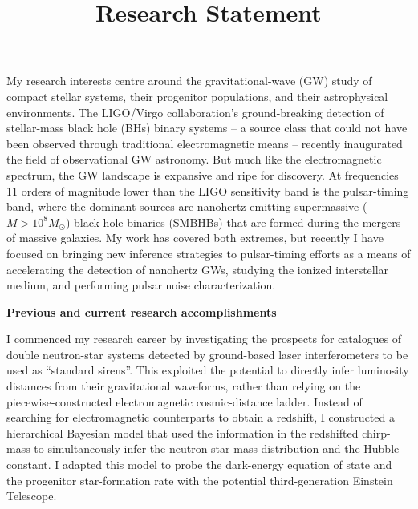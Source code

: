 \documentclass[11pt,letterpaper,sans]{moderncv} %
\title{\huge{Research Statement}}
\begin{document}
\makecvtitle %
\vspace{-6mm}

My research interests centre around the gravitational-wave (GW) study of compact stellar systems, their progenitor populations, and their astrophysical environments. The LIGO/Virgo collaboration's ground-breaking detection of stellar-mass black hole (BHs) binary systems -- a source class that could not have been observed through traditional electromagnetic means -- recently inaugurated the field of observational GW astronomy. But much like the electromagnetic spectrum, the GW landscape is expansive and ripe for discovery. At frequencies 11 orders of magnitude lower than the LIGO sensitivity band is the pulsar-timing band, where the dominant sources are nanohertz-emitting supermassive ($M > 10^8M_\odot$) black-hole binaries (SMBHBs) that are formed during the mergers of massive galaxies. My work has covered both extremes, but recently I have focused on bringing new inference strategies to pulsar-timing efforts as a means of accelerating the detection of nanohertz GWs, studying the ionized interstellar medium, and performing pulsar noise characterization.
\vspace{1mm}

\textbf{Previous and current research accomplishments}
\vspace{1mm}

I commenced my research career by investigating the prospects for catalogues of double neutron-star systems detected by ground-based laser interferometers to be used as ``standard sirens''. This exploited the potential to directly infer luminosity distances from their gravitational waveforms, rather than relying on the piecewise-constructed electromagnetic cosmic-distance ladder. Instead of searching for electromagnetic counterparts to obtain a redshift, I constructed a hierarchical Bayesian model that used the information in the redshifted chirp-mass to simultaneously infer the neutron-star mass distribution and the Hubble constant. %
I adapted this model to probe the dark-energy equation of state and the progenitor star-formation rate with the potential third-generation Einstein Telescope.
\vspace{1mm}
\end{document}

